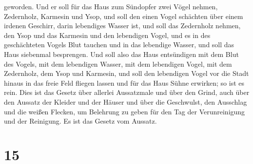 geworden.  Und er soll für das Haus zum Sündopfer zwei
Vögel nehmen, Zedernholz, Karmesin und Ysop,  und soll
den einen Vogel schächten über einem irdenen Geschirr, darin lebendiges
Wasser ist,  und soll das Zedernholz nehmen, den Ysop und
das Karmesin und den lebendigen Vogel, und es in des geschächteten
Vogels Blut tauchen und in das lebendige Wasser, und soll das Haus
siebenmal besprengen.  Und soll also das Haus entsündigen
mit dem Blut des Vogels, mit dem lebendigen Wasser, mit dem lebendigen
Vogel, mit dem Zedernholz, dem Ysop und Karmesin,  und
soll den lebendigen Vogel vor die Stadt hinaus in das freie Feld fliegen
lassen und für das Haus Sühne erwirken; so ist es rein. 
Dies ist das Gesetz über allerlei Aussatzmale und über den Grind,
 auch über den Aussatz der Kleider und der Häuser
 und über die Geschwulst, den Ausschlag und die weißen
Flecken,  um Belehrung zu geben für den Tag der
Verunreinigung und der Reinigung. Es ist das Gesetz vom Aussatz.

\hypertarget{section-14}{%
\section{15}\label{section-14}}

